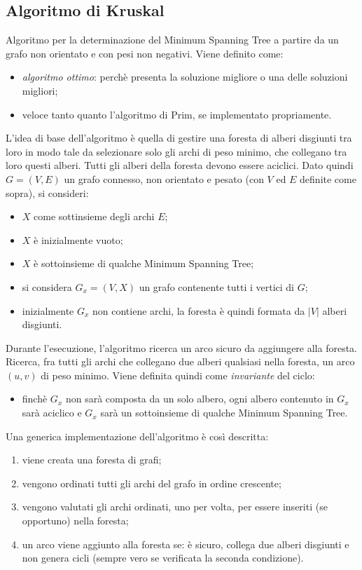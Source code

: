 \subsection{Algoritmo di Kruskal}
Algoritmo per la determinazione del Minimum Spanning Tree a partire da un grafo non orientato e con pesi non negativi. Viene definito come:
\begin{itemize}
	\item \textit{algoritmo ottimo}: perchè presenta la soluzione migliore o una delle soluzioni migliori;
	\item veloce tanto quanto l'algoritmo di Prim, se implementato propriamente.
\end{itemize}
L'idea di base dell'algoritmo è quella di gestire una foresta di alberi disgiunti tra loro in modo tale da selezionare solo gli archi di peso minimo, che collegano tra loro questi alberi. Tutti gli alberi della foresta devono essere aciclici. Dato quindi $G=(V,E)$ un grafo connesso, non orientato e pesato (con $V$ ed $E$ definite come sopra), si consideri:
\begin{itemize}
	\item $X$ come sottinsieme degli archi $E$;
	\item $X$ è inizialmente vuoto;
	\item $X$ è sottoinsieme di qualche Minimum Spanning Tree;
	\item si considera $G_x=(V,X)$ un grafo contenente tutti i vertici di $G$;
	\item inizialmente $G_x$ non contiene archi, la foresta è quindi formata da $|V|$ alberi disgiunti.
\end{itemize}
Durante l'esecuzione, l'algoritmo ricerca un arco sicuro da aggiungere alla foresta. Ricerca, fra tutti gli archi che collegano due alberi qualsiasi nella foresta, un arco $(u,v)$ di peso minimo. Viene definita quindi come \textit{invariante} del ciclo:
\begin{itemize}
	\item finchè $G_x$ non sarà composta da un solo albero, ogni albero contenuto in $G_x$ sarà aciclico e $G_x$ sarà un sottoinsieme di qualche Minimum Spanning Tree.
\end{itemize}
Una generica implementazione dell'algoritmo è così descritta:
\begin{enumerate}
	\item viene creata una foresta di grafi;
	\item vengono ordinati tutti gli archi del grafo in ordine crescente;
	\item vengono valutati gli archi ordinati, uno per volta, per essere inseriti (se opportuno) nella foresta;
	\item un arco viene aggiunto alla foresta se: è sicuro, collega due alberi disgiunti e non genera cicli (sempre vero se verificata la seconda condizione).
\end{enumerate}
